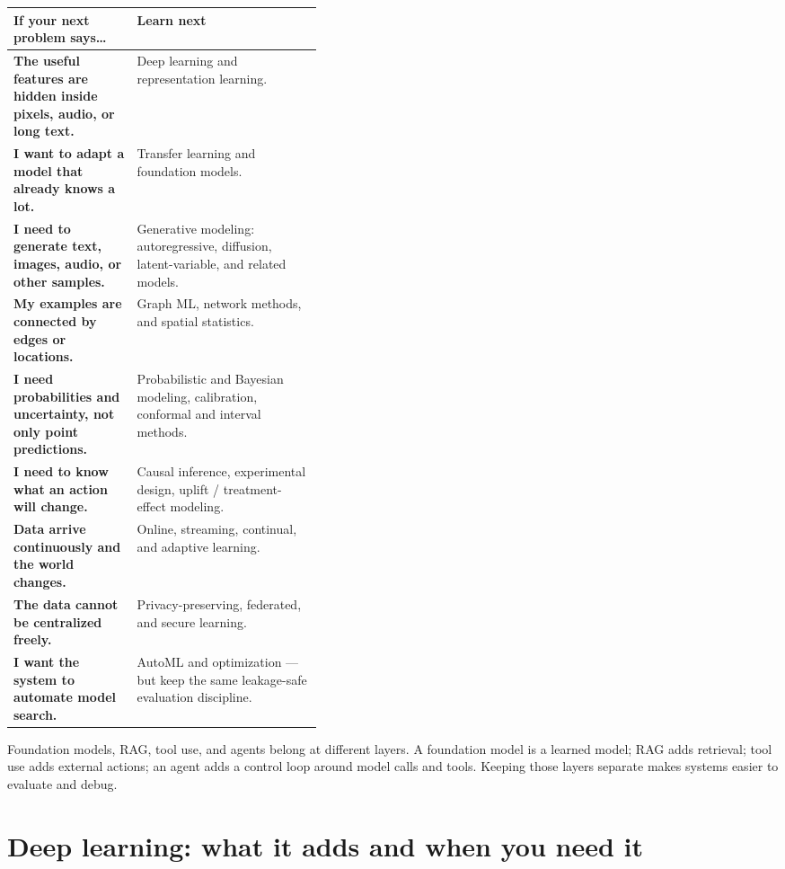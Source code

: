 \begin{mltable}
\begin{tabularx}{\linewidth}{@{}>{\bfseries\leavevmode\color{MLNavy}}p{0.40\linewidth}X@{}}
\toprule
\rowcolor{MLPaleBlue!92}
If your next problem says\ldots & Learn next \\
\midrule
The useful features are hidden inside pixels, audio, or long text. & Deep learning and representation learning. \\
I want to adapt a model that already knows a lot. & Transfer learning and foundation models. \\
I need to generate text, images, audio, or other samples. & Generative modeling: autoregressive, diffusion, latent-variable, and related models. \\
My examples are connected by edges or locations. & Graph ML, network methods, and spatial statistics. \\
I need probabilities and uncertainty, not only point predictions. & Probabilistic and Bayesian modeling, calibration, conformal and interval methods. \\
I need to know what an action will change. & Causal inference, experimental design, uplift / treatment-effect modeling. \\
Data arrive continuously and the world changes. & Online, streaming, continual, and adaptive learning. \\
The data cannot be centralized freely. & Privacy-preserving, federated, and secure learning. \\
I want the system to automate model search. & AutoML and optimization --- but keep the same leakage-safe evaluation discipline. \\
\bottomrule
\end{tabularx}
\end{mltable}

\begin{keyidea}
Foundation models, RAG, tool use, and agents belong at different layers. A foundation model is a learned model; RAG adds retrieval; tool use adds external actions; an agent adds a control loop around model calls and tools. Keeping those layers separate makes systems easier to evaluate and debug.
\end{keyidea}



\section{Deep learning: what it adds and when you need it}

